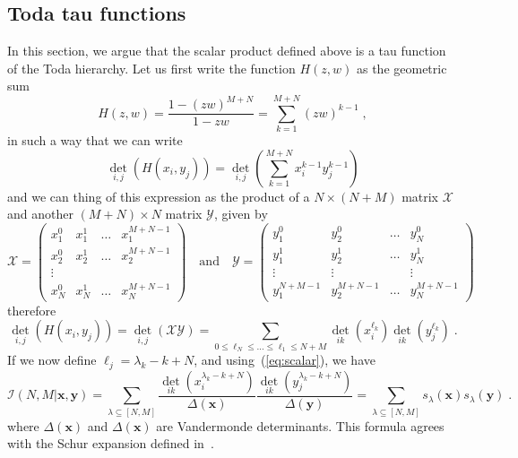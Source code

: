 \documentclass[a4paper,11pt]{amsart}
\begin{document}

\subsection{Toda tau functions}
In this section, we argue that the scalar product defined above is a tau function 
of the Toda hierarchy. Let us first write the function \(H(z,w)\) as the geometric sum 
\begin{equation}
\label{eq:h-exp}
  H(z,w) = \frac{1 - (zw)^{M+N}}{1 - zw} = \sum_{k=1}^{M+N} (zw)^{k-1} \; , 
\end{equation}
in such a way that 
we can write
\begin{equation}
  \det_{i,j} \left(H(x_i, y_j)\right) = \det_{i,j} \left( \sum_{k=1}^{M+N} x_i^{k-1} y_j^{k-1}\right)
\end{equation}
and we can thing of this expression as the product of a \(N\times (N+M)\) matrix \(\mathcal{X}\)
and another \((M + N)\times N\) matrix \(\mathcal{Y}\), given by
\begin{equation}
  \mathcal{X} = 
  \begin{pmatrix}
  x_1^0 & x_1^1 & \dots & x_1^{M+N-1} \\  
  x_2^0 & x_2^1 & \dots & x_2^{M+N-1} \\  
  \vdots \\
  x_N^0 & x_N^1 & \dots & x_N^{M+N-1} 
  \end{pmatrix}\quad \textrm{and} \quad 
  \mathcal{Y} = 
  \begin{pmatrix}
  y_1^0 & y_2^0 & \dots & y_N^0 \\  
  y_1^1 & y_2^1 & \dots & y_N^1 \\  
  \vdots & \vdots & & \vdots \\
  y_1^{N+M-1} & y_2^{M+N-1} & \dots & y_N^{M+N-1} 
  \end{pmatrix}
\end{equation}
therefore 
\begin{equation}
  \det_{i,j} \left(H(x_i, y_j)\right) =  \det_{i,j} \left( \mathcal{X}\mathcal{Y}\right)
= \sum_{0 \leq \ell_{N} \leq \dots \leq \ell_1\leq N+M }  \det_{ik}(x_i^{\ell_k})  \det_{ik}(y_j^{\ell_k})\; .
\end{equation}
If we now define \(\ell_j = \lambda_k - k + N\), and
using~(\ref{eq:scalar}), we have
\begin{equation}
\label{eq:scalar_exp}
\mathcal{I}(N, M|\bm{x}, \bm{y}) = \sum_{\lambda\subseteq [N,M]}
\frac{\det_{ik}(x_i^{\lambda_k - k + N})}{\Delta(\bm{x})} \frac{ \det_{ik}(y_j^{\lambda_k - k + N})}{\Delta(\bm{y})}
= \sum_{\lambda\subseteq [N,M]} s_\lambda(\bm{x}) s_\lambda(\bm{y}) \; .
\end{equation}
where \(\Delta(\bm{x})\) and \(\Delta(\bm{x})\) are Vandermonde
determinants. This formula agrees with the Schur expansion defined
in~\cite{Bogoliubov2005}.
\end{document}
